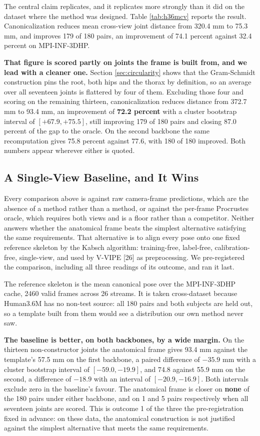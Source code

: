 \documentclass[12pt,a4paper]{report}
\begin{document}
The central claim replicates, and it replicates more strongly than it did on the dataset where the method was designed. Table \ref{tab:h36mcv} reports the result. Canonicalization reduces mean cross-view joint distance from 320.4 mm to 75.3 mm, and improves 179 of 180 pairs, an improvement of 74.1 percent against 32.4 percent on MPI-INF-3DHP.

\textbf{That figure is scored partly on joints the frame is built from, and we lead with a cleaner one.} Section \ref{sec:circularity} shows that the Gram-Schmidt construction pins the root, both hips and the thorax by definition, so an average over all seventeen joints is flattered by four of them. Excluding those four and scoring on the remaining thirteen, canonicalization reduces distance from 372.7 mm to 93.4 mm, an improvement of \textbf{72.2 percent} with a cluster bootstrap interval of $[+67.9, +75.5]$, still improving 179 of 180 pairs and closing 87.0 percent of the gap to the oracle. On the second backbone the same recomputation gives 75.8 percent against 77.6, with 180 of 180 improved. Both numbers appear wherever either is quoted.

\subsection{A Single-View Baseline, and It Wins}
\label{sec:template}

Every comparison above is against raw camera-frame predictions, which are the absence of a method rather than a method, or against the per-frame Procrustes oracle, which requires both views and is a floor rather than a competitor. Neither answers whether the anatomical frame beats the simplest alternative satisfying the same requirements. That alternative is to align every pose onto one fixed reference skeleton by the Kabsch algorithm: training-free, label-free, calibration-free, single-view, and used by V-VIPE [26] as preprocessing. We pre-registered the comparison, including all three readings of its outcome, and ran it last.

The reference skeleton is the mean canonical pose over the MPI-INF-3DHP cache, 2460 valid frames across 26 streams. It is taken cross-dataset because Human3.6M has no non-test source: all 180 pairs and both subjects are held out, so a template built from them would see a distribution our own method never saw.

\textbf{The baseline is better, on both backbones, by a wide margin.} On the thirteen non-constructor joints the anatomical frame gives 93.4 mm against the template's 57.5 mm on the first backbone, a paired difference of $-35.9$ mm with a cluster bootstrap interval of $[-59.0, -19.9]$, and 74.8 against 55.9 mm on the second, a difference of $-18.9$ with an interval of $[-20.9, -16.9]$. Both intervals exclude zero in the baseline's favour. The anatomical frame is closer on \textbf{none} of the 180 pairs under either backbone, and on 1 and 5 pairs respectively when all seventeen joints are scored. This is outcome 1 of the three the pre-registration fixed in advance: on these data, the anatomical construction is not justified against the simplest alternative that meets the same requirements.
\end{document}
